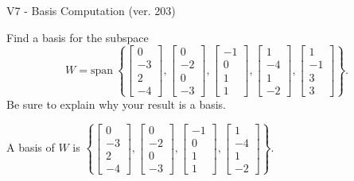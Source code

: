 \begin{exercise}
  \begin{exerciseTitle}V7 - Basis Computation (ver. 203)\end{exerciseTitle}
  \begin{exerciseStatement}
    Find a basis for the subspace 
\[W=\mathrm{span}\ \left\{\left[\begin{array}{r}
0 \\
-3 \\
2 \\
-4
\end{array}\right] , \left[\begin{array}{r}
0 \\
-2 \\
0 \\
-3
\end{array}\right] , \left[\begin{array}{r}
-1 \\
0 \\
1 \\
1
\end{array}\right] , \left[\begin{array}{r}
1 \\
-4 \\
1 \\
-2
\end{array}\right] , \left[\begin{array}{r}
1 \\
-1 \\
3 \\
3
\end{array}\right]\right\}.\]
 Be sure to explain why your result is a basis.


  \end{exerciseStatement}
  \begin{exerciseAnswer}
   A basis of \(W\) is  \(\left\{\left[\begin{array}{r}
0 \\
-3 \\
2 \\
-4
\end{array}\right] , \left[\begin{array}{r}
0 \\
-2 \\
0 \\
-3
\end{array}\right] , \left[\begin{array}{r}
-1 \\
0 \\
1 \\
1
\end{array}\right] , \left[\begin{array}{r}
1 \\
-4 \\
1 \\
-2
\end{array}\right]\right\}\).
  


  \end{exerciseAnswer}
\end{exercise}